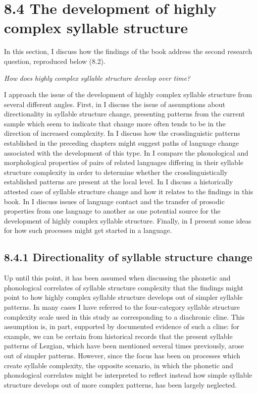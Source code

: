 \section{8.4 The development of highly complex syllable structure}

  In this section, I discuss how the findings of the book address the second research question, reproduced below (8.2).



\ea\label{ex:(8.2)}
   \textit{How} \textit{does} \textit{highly} \textit{complex} \textit{syllable} \textit{structure} \textit{develop} \textit{over} \textit{time?}
\z



  I approach the issue of the development of highly complex syllable structure from several different angles. First, in  I discuss the issue of assumptions about directionality in syllable structure change, presenting patterns from the current sample which seem to indicate that change more often tends to be in the direction of increased complexity. In  I discuss how the crosslinguistic patterns established in the preceding chapters might suggest paths of language change associated with the development of this type. In  I compare the phonological and morphological properties of pairs of related languages differing in their syllable structure complexity in order to determine whether the crosslinguistically established patterns are present at the local level. In  I discuss a historically attested case of syllable structure change and how it relates to the findings in this book. In  I discuss issues of language contact and the transfer of prosodic properties from one language to another as one potential source for the development of highly complex syllable structure. Finally, in  I present some ideas for how such processes might get started in a language.


\subsection{8.4.1 Directionality of syllable structure change}

  Up until this point, it has been assumed when discussing the phonetic and phonological correlates of syllable structure complexity that the findings might point to how highly complex syllable structure develops out of simpler syllable patterns. In many cases I have referred to the four-category syllable structure complexity scale used in this study as corresponding to a diachronic cline. This assumption is, in part, supported by documented evidence of such a cline: for example, we can be certain from historical records that the present syllable patterns of Lezgian, which have been mentioned several times previously, arose out of simpler patterns. However, since the focus has been on processes which create syllable complexity, the opposite scenario, in which the phonetic and phonological correlates might be interpreted to reflect instead how simple syllable structure develops out of more complex patterns, has been largely neglected.



